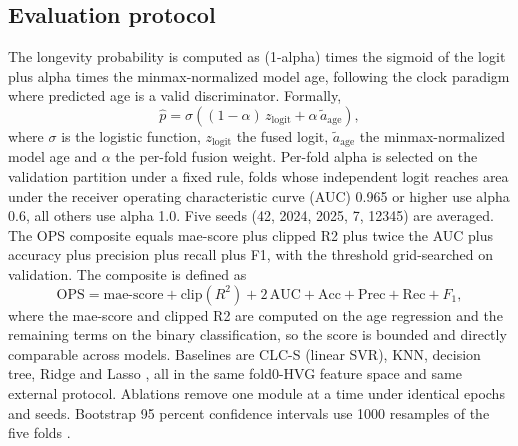 \documentclass[11pt,a4paper]{article}
\begin{document}
\subsection{Evaluation protocol}\label{sec:eval}
The longevity probability is computed as (1-alpha) times the sigmoid of the logit plus alpha times the minmax-normalized model age, following the clock paradigm where predicted age is a valid discriminator. Formally,
\begin{equation}
\hat{p} = \sigma\!\left((1-\alpha)\, z_{\mathrm{logit}} + \alpha\, \tilde{a}_{\mathrm{age}}\right),
\label{eq:prob}
\end{equation}
 where $\sigma$ is the logistic function, $z_{\mathrm{logit}}$ the fused logit, $\tilde{a}_{\mathrm{age}}$ the minmax-normalized model age and $\alpha$ the per-fold fusion weight. Per-fold alpha is selected on the validation partition under a fixed rule, folds whose independent logit reaches area under the receiver operating characteristic curve (AUC) 0.965 or higher use alpha 0.6, all others use alpha 1.0. Five seeds (42, 2024, 2025, 7, 12345) are averaged. The OPS composite equals mae-score plus clipped R2 plus twice the AUC plus accuracy plus precision plus recall plus F1, with the threshold grid-searched on validation. The composite is defined as
\begin{equation}
\mathrm{OPS} = \mathrm{mae\text{-}score} + \mathrm{clip}(R^2) + 2\,\mathrm{AUC} + \mathrm{Acc} + \mathrm{Prec} + \mathrm{Rec} + F_1,
\label{eq:ops}
\end{equation}
 where the mae-score and clipped R2 are computed on the age regression and the remaining terms on the binary classification, so the score is bounded and directly comparable across models. Baselines are CLC-S (linear SVR), KNN, decision tree, Ridge and Lasso \cite{tibshirani1996regression,breiman2001random,cover1967nearest,pedregosa2011scikit,paszke2019pytorch}, all in the same fold0-HVG feature space and same external protocol. Ablations remove one module at a time under identical epochs and seeds. Bootstrap 95 percent confidence intervals use 1000 resamples of the five folds \cite{efron1993introduction,delong1988comparing,benjamini1995controlling,mann1947test,liu2024statistical,chen2024evaluation,zhu2024benchmark,robin_2011,tsoucas_2019}.
\end{document}
